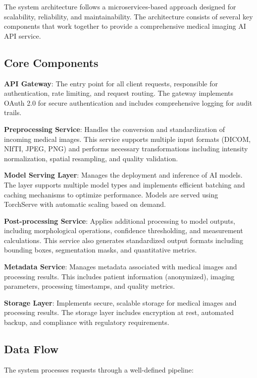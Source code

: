 \documentclass[12pt,a4paper]{article}
\begin{document}
The system architecture follows a microservices-based approach designed for scalability, reliability, and maintainability. The architecture consists of several key components that work together to provide a comprehensive medical imaging AI API service.

\subsection{Core Components}

\textbf{API Gateway}: The entry point for all client requests, responsible for authentication, rate limiting, and request routing. The gateway implements OAuth 2.0 for secure authentication and includes comprehensive logging for audit trails.

\textbf{Preprocessing Service}: Handles the conversion and standardization of incoming medical images. This service supports multiple input formats (DICOM, NIfTI, JPEG, PNG) and performs necessary transformations including intensity normalization, spatial resampling, and quality validation.

\textbf{Model Serving Layer}: Manages the deployment and inference of AI models. The layer supports multiple model types and implements efficient batching and caching mechanisms to optimize performance. Models are served using TorchServe with automatic scaling based on demand.

\textbf{Post-processing Service}: Applies additional processing to model outputs, including morphological operations, confidence thresholding, and measurement calculations. This service also generates standardized output formats including bounding boxes, segmentation masks, and quantitative metrics.

\textbf{Metadata Service}: Manages metadata associated with medical images and processing results. This includes patient information (anonymized), imaging parameters, processing timestamps, and quality metrics.

\textbf{Storage Layer}: Implements secure, scalable storage for medical images and processing results. The storage layer includes encryption at rest, automated backup, and compliance with regulatory requirements.

\subsection{Data Flow}

The system processes requests through a well-defined pipeline:
\end{document}
